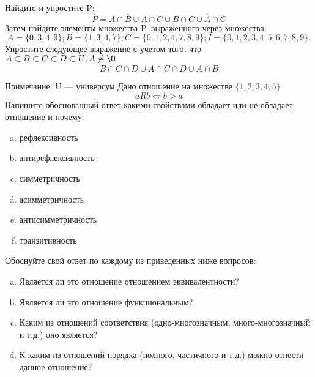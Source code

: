 \documentclass[10pt]{exam}
\begin{document}
\begin{questions}
\question
Найдите и упростите P:
\begin{equation*}
\overline{P} = A \cap \overline{B} \cup A \cap C \cup B \cap C \cup \overline{A} \cap C
\end{equation*}
Затем найдите элементы множества P, выраженного через множества:
\begin{equation*}
A = \{0, 3, 4, 9\}; 
B = \{1, 3, 4, 7\};
C = \{0, 1, 2, 4, 7, 8, 9\};
I = \{0, 1, 2, 3, 4, 5, 6, 7, 8, 9\}.
\end{equation*}\question
Упростите следующее выражение с учетом того, что $A\subset B \subset C \subset D \subset U; A \neq \O$
\begin{equation*}
\overline{B} \cap \overline{C} \cap D \cup \overline{A} \cap \overline{C} \cap D \cup \overline{A} \cap B
\end{equation*}

Примечание: U — универсум\question
Дано отношение на множестве $\{1, 2, 3, 4, 5\}$ 
\begin{equation*}
aRb \iff b > a
\end{equation*}
Напишите обоснованный ответ какими свойствами обладает или не обладает отношение и почему:   
\begin{enumerate} [a)]\setcounter{enumi}{0}
\item рефлексивность
\item антирефлексивность
\item симметричность
\item асимметричность
\item антисимметричность
\item транзитивность
\end{enumerate}

Обоснуйте свой ответ по каждому из приведенных ниже вопросов:
\begin{enumerate} [a)]\setcounter{enumi}{0}
    \item Является ли это отношение отношением эквивалентности?
    \item Является ли это отношение функциональным?
    \item Каким из отношений соответствия (одно-многозначным, много-многозначный и т.д.) оно является?
    \item К каким из отношений порядка (полного, частичного и т.д.) можно отнести данное отношение?
\end{enumerate}


\end{questions}
\end{document}
